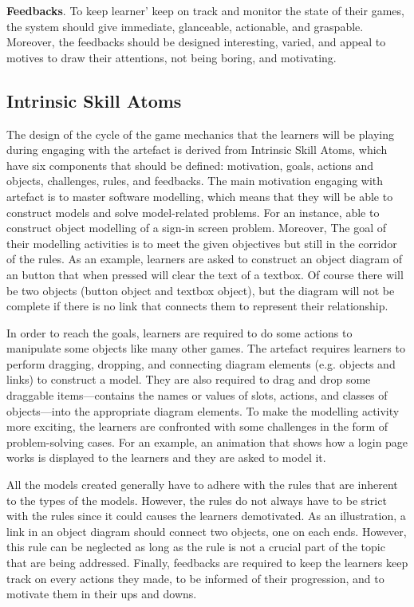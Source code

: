 \documentclass[runningheads,a4paper]{llncs}
\begin{document}
\textbf{Feedbacks}. To keep learner' keep on track and monitor the state of their games, the system should give immediate, glanceable, actionable, and graspable. Moreover, the feedbacks should be designed interesting, varied, and appeal to motives to draw their attentions, not being boring, and motivating. 

\subsection{Intrinsic Skill Atoms}
The design of the cycle of the game mechanics that the learners will be playing during engaging with the artefact is derived from Intrinsic Skill Atoms, which have six components that should be defined: motivation, goals, actions and objects, challenges, rules, and feedbacks. The main motivation engaging with artefact is to master software modelling, which means that they will be able to construct models and solve model-related problems. For an instance, able to construct object modelling of a sign-in screen problem. Moreover, The goal of their modelling activities is to meet the given objectives but still in the corridor of the rules. As an example, learners are asked to construct an object diagram of an button that when pressed will clear the text of a textbox. Of course there will be two objects (button object and textbox object), but the diagram will not be complete if there is no link that connects them to represent their relationship.

In order to reach the goals, learners are required to do some actions to manipulate some objects like many other games. The artefact requires learners to perform dragging, dropping, and connecting diagram elements (e.g. objects and links) to construct a model. They are also required to drag and drop some draggable items---contains the names or values of slots, actions, and classes of objects---into the appropriate diagram elements. To make the modelling activity more exciting, the learners are confronted with some challenges in the form of problem-solving cases. For an example, an animation that shows how a login page works is displayed to the learners and they are asked to model it. 

All the models created generally have to adhere with the rules that are inherent to the types of the models. However, the rules do not always have to be strict with the rules since it could causes the learners demotivated. As an illustration, a link in an object diagram should connect two objects, one on each ends. However, this rule can be neglected as long as the rule is not a crucial part of the topic that are being addressed. Finally, feedbacks are required to keep the learners keep track on every actions they made, to be informed of their progression, and to motivate them in their ups and downs.
\end{document}
